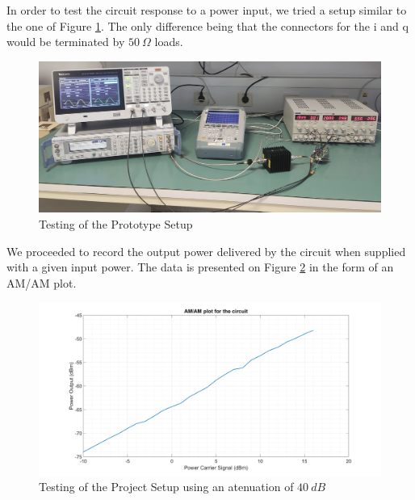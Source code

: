 \par In order to test the circuit response to a power input, we tried a setup similar to the one of Figure \ref{fig:ch4_fullSetup.jpg}. The only difference being that the connectors for the \ac{i} and \ac{q} would be terminated by $50\:\si{\Omega}$ loads.

\begin{figure}[H]
    \vspace*{0cm}
    \centering
    \includegraphics[width=1\linewidth]{figs/ch4_fullSetup.jpg}
    \caption{Testing of the Prototype Setup}
    \label{fig:ch4_fullSetup.jpg}
\end{figure}

\par We proceeded to record the output power delivered by the circuit when supplied with a given input power. The data is presented on Figure \ref{fig:ch4_AMAM.png} in the form of an AM/AM plot.

\begin{figure}[H]
    \vspace*{0cm}
    \centering
    \includegraphics[width=1\linewidth]{figs/ch4_AMAM.png}
    \caption{Testing of the Project Setup using an atenuation of $40 \:\si{dB}$}
    \label{fig:ch4_AMAM.png}
\end{figure}

